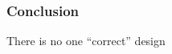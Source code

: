 
\begin{frame}
  \frametitle{Conclusion}

  \centering
  There is no one ``correct'' design
\end{frame}
